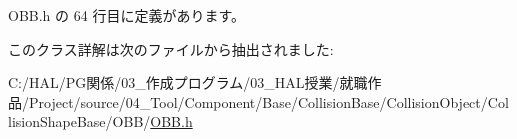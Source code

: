  O\+B\+B.\+h の 64 行目に定義があります。



このクラス詳解は次のファイルから抽出されました\+:\begin{DoxyCompactItemize}
\item 
C\+:/\+H\+A\+L/\+P\+G関係/03\+\_\+作成プログラム/03\+\_\+\+H\+A\+L授業/就職作品/\+Project/source/04\+\_\+\+Tool/\+Component/\+Base/\+Collision\+Base/\+Collision\+Object/\+Collision\+Shape\+Base/\+O\+B\+B/\mbox{\hyperlink{_o_b_b_8h}{O\+B\+B.\+h}}\end{DoxyCompactItemize}
